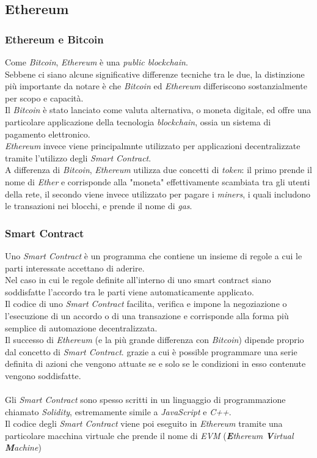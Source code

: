 \documentclass[11pt]{thesistemp}
\begin{document}
\pagebreak
\subsection{Ethereum}

\subsubsection{Ethereum e Bitcoin}

Come \textit{Bitcoin}, \textit{Ethereum} è una \textit{public blockchain}.\\
Sebbene ci siano alcune significative differenze tecniche tra le due, la distinzione più importante da notare è che \textit{Bitcoin} ed \textit{Ethereum} differiscono sostanzialmente per scopo e capacità.\\
Il \textit{Bitcoin} è stato lanciato come valuta alternativa, o moneta digitale, ed offre una particolare applicazione della tecnologia \textit{blockchain}, ossia un sistema di pagamento elettronico.\\
\textit{Ethereum} invece viene principalmnte utilizzato per applicazioni decentralizzate tramite l'utilizzo degli \textit{Smart Contract}.\\
A differenza di \textit{Bitcoin}, \textit{Ethereum} utilizza due concetti di \textit{token}: il primo prende il nome di \textit{Ether} e corrisponde alla "moneta" effettivamente scambiata tra gli utenti della rete, il secondo viene invece utilizzato per pagare i \textit{miners}, i quali includono le transazioni nei blocchi, e prende il nome di \textit{gas}.

\subsubsection{Smart Contract}

Uno \textit{Smart Contract} è un programma che contiene un insieme di regole a cui le parti interessate accettano di aderire.\\
Nel caso in cui le regole definite all'interno di uno smart contract siano soddisfatte l'accordo tra le parti viene automaticamente applicato.\\
Il codice di uno \textit{Smart Contract} facilita, verifica e impone la negoziazione o l'esecuzione di un accordo o di una transazione e corrisponde alla forma più semplice di automazione decentralizzata.\\
Il successo di \textit{Ethereum} (e la più grande differenza con \textit{Bitcoin}) dipende proprio dal concetto di \textit{Smart Contract}. grazie a cui è possible programmare una serie definita di azioni che vengono attuate se e solo se le condizioni in esso contenute vengono soddisfatte.\\\\
Gli \textit{Smart Contract} sono spesso scritti in un linguaggio di programmazione chiamato \textit{Solidity}, estremamente simile a \textit{JavaScript} e \textit{C++}.\\
Il codice degli \textit{Smart Contract} viene poi eseguito in \textit{Ethereum} tramite una particolare macchina virtuale che prende il nome di \textit{EVM} (\textit{\textbf{E}thereum \textbf{V}irtual \textbf{M}achine})
\pagebreak
\end{document}

